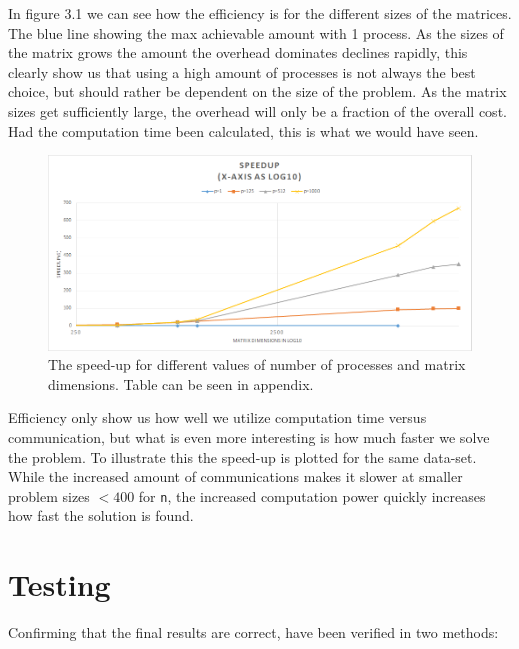 \documentclass[a4paper,11pt,oneside]{book}
\begin{document}
In figure 3.1 we can see how the efficiency is for the different sizes of the matrices. The blue line showing the max achievable amount with 1 process. As the sizes of the matrix grows the amount the overhead dominates declines rapidly, this clearly show us that using a high amount of processes is not always the best choice, but should rather be dependent on the size of the problem. As the matrix sizes get sufficiently large, the overhead will only be a fraction of the overall cost. Had the computation time been calculated, this is what we would have seen.

\begin{figure}[H]
  \centering
  \includegraphics[width=0.9\linewidth]{plots-speedup.png}
  \caption{The speed-up for different values of number of processes and matrix dimensions. Table can be seen in appendix.}
  \centering
  \label{fig:sub1}
\end{figure}

Efficiency only show us how well we utilize computation time versus communication, but what is even more interesting is how much faster we solve the problem. To illustrate this the speed-up is plotted for the same data-set. While the increased amount of communications makes it slower at smaller problem sizes $<400$ for \verb!n!, the increased computation power quickly increases how fast the solution is found.


%
%
\chapter{Testing}
Confirming that the final results are correct, have been verified in two methods:
\end{document}

